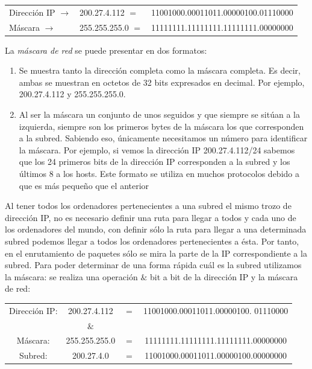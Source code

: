 \documentclass[10pt,a4paper,spanish]{report}
\begin{document}
\begin{tabular}{l l l}
 Dirección IP $\longrightarrow$ & 200.27.4.112 $ = $ &  11001000.00011011.00000100.01110000 \\
 Máscara $\longrightarrow$ & 255.255.255.0 $ = $ &11111111.11111111.11111111.00000000 \\
\end{tabular}

La \textit{\textcolor{tema4}{máscara de red}} se puede presentar en dos formatos:
\begin{enumerate}[\color{tema4}{$\heartsuit$}]
  \item Se muestra tanto la dirección completa como la máscara completa. Es decir, ambas se muestran en octetos de 32 bits expresados en decimal. Por ejemplo, 200.27.4.112 y 255.255.255.0.

  \item Al ser la máscara un conjunto de unos seguidos y que siempre se sitúan a la izquierda, siempre son los primeros bytes de la máscara los que corresponden a la subred. Sabiendo eso, únicamente necesitamos un número para identificar la máscara. Por ejemplo, si vemos la dirección IP 200.27.4.112/24 sabemos que los 24 primeros bits de la dirección IP corresponden a la subred y los últimos 8 a los hosts. Este formato se utiliza en muchos protocolos debido a que es más pequeño que el anterior
\end{enumerate}

Al tener todos los ordenadores pertenecientes a una subred el mismo trozo de dirección IP, no es necesario definir una ruta para llegar a todos y cada uno de los ordenadores del mundo, con definir sólo la ruta para llegar a una determinada subred podemos llegar a todos los ordenadores pertenecientes a ésta. Por tanto, en el enrutamiento de paquetes sólo se mira la parte de la IP correspondiente a la subred. Para poder determinar de una forma rápida cuál es la subred utilizamos la máscara: se realiza una operación $\&$ bit a bit de la dirección IP y la máscara de red:

\begin{tabular}{c c c c}
Dirección IP: & 200.27.4.112 & $ = $ & 11001000.00011011.00000100.
01110000 \\
& $\&$ & & \\
Máscara: & 255.255.255.0 & $ = $ & 11111111.11111111.11111111.00000000 \\
\hline
Subred: & 200.27.4.0 & $ = $ & 11001000.00011011.00000100.00000000 \\
\end{tabular}
\end{document}
